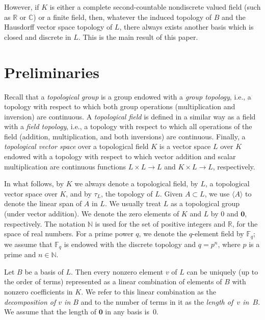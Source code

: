 \documentclass[a4paper]{amsart}
\theoremstyle{definition}
\begin{document}
However, if $K$ is either a complete second-countable nondiscrete valued field 
(such as $\mathbb R$ or $\mathbb C$) or a finite field, 
then, whatever the induced topology of $B$ and the Hausdorff vector space topology of $L$, there 
always exists another basis which is closed and discrete in $L$. This is the main result of this paper. 

\section{Preliminaries}

Recall that a \emph{topological group} is a group endowed with a \emph{group topology}, i.e., a topology with 
respect to which both group operations 
(multiplication and inversion) are continuous. A \emph{topological field} is defined in a similar way as a field 
with a \emph{field topology}, i.e., a topology with respect to which all operations of the field (addition, multiplication, and both inversions) 
are continuous. Finally, a \emph{topological vector space} over a topological field $K$ is a vector space $L$ over $K$ endowed 
with a topology with respect to which vector addition and scalar multiplication are continuous functions 
$L\times L \to L$ and $K\times L\to L$, respectively. 

In what follows, by $K$ we always denote a topological field, by $L$, a topological vector space over $K$, and by 
$\tau_L$, the topology of $L$. Given $A\subset L$, we use $\langle A\rangle $ to denote the linear span of $A$ in 
$L$. We usually treat $L$ as a topological group (under vector addition). We denote the 
zero elements of $K$ and $L$ by $0$ and $\mathbf 0$, respectively. The notation $\mathbb N$ is used for the set of 
positive integers and $\mathbb R$, for the space of real numbers. For a prime power $q$, we denote the $q$-element 
field by $\mathbb F_q$; we assume that $\mathbb F_q$ is endowed with the discrete topology and 
$q=p^n$, where $p$ is a prime and $n\in \mathbb N$. 

Let $B$ be a basis of $L$. Then every nonzero element $v$ of $L$ can be uniquely (up to the order of terms) 
represented as a linear combination of elements of $B$ with nonzero coefficients in $K$. We refer to this linear 
combination as the \emph{decomposition of $v$ in $B$} and to the number of terms in it as the \emph{length of~$v$ 
in~$B$}. We assume that the length of $\mathbf 0$ in any basis is~$0$. 
\end{document}
